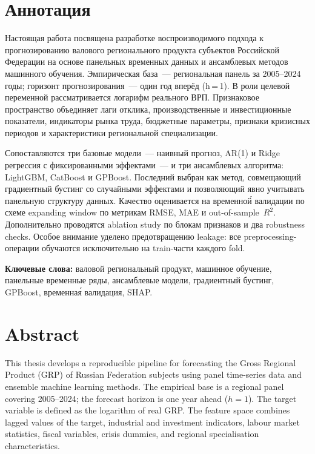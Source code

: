 \documentclass[12pt,a4paper]{article}
\begin{document}
\section*{Аннотация}

Настоящая работа посвящена разработке воспроизводимого подхода
к прогнозированию валового регионального продукта субъектов Российской
Федерации на основе панельных временных данных и ансамблевых методов
машинного обучения. Эмпирическая база~--- региональная панель за 2005--2024
годы; горизонт прогнозирования~--- один год вперёд (h\,=\,1). В роли целевой
переменной рассматривается логарифм реального ВРП. Признаковое пространство
объединяет лаги отклика, производственные и инвестиционные показатели,
индикаторы рынка труда, бюджетные параметры, признаки кризисных периодов
и характеристики региональной специализации.

Сопоставляются три базовые модели~--- наивный прогноз, AR(1) и Ridge
регрессия с фиксированными эффектами~--- и три ансамблевых алгоритма:
LightGBM, CatBoost и GPBoost. Последний выбран как метод, совмещающий
градиентный бустинг со случайными эффектами и позволяющий явно учитывать
панельную структуру данных. Качество оценивается на временно\'{й} валидации
по схеме expanding window по метрикам RMSE, MAE и out-of-sample~$R^2$.
Дополнительно проводятся ablation study по блокам признаков и два
robustness checks. Особое внимание уделено предотвращению leakage: все
preprocessing-операции обучаются исключительно на train-части каждого fold.

\smallskip\noindent
\textbf{Ключевые слова:} валовой региональный продукт, машинное обучение,
панельные временные ряды, ансамблевые модели, градиентный бустинг,
GPBoost, временна\'{я} валидация, SHAP.

\newpage
\section*{Abstract}

This thesis develops a reproducible pipeline for forecasting the Gross Regional
Product (GRP) of Russian Federation subjects using panel time-series data and
ensemble machine learning methods. The empirical base is a regional panel
covering 2005--2024; the forecast horizon is one year ahead ($h=1$). The target
variable is defined as the logarithm of real GRP. The feature space combines
lagged values of the target, industrial and investment indicators, labour market
statistics, fiscal variables, crisis dummies, and regional specialisation
characteristics.
\end{document}
